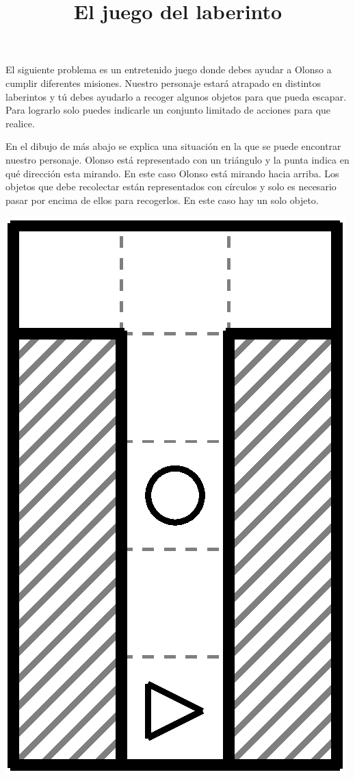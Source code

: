 \documentclass{oci}
\title{El juego del laberinto}
\begin{document}
\begin{problemDescription}
  El siguiente problema es un entretenido juego donde debes ayudar a Olonso a cumplir diferentes misiones.
  Nuestro personaje estará atrapado en distintos laberintos y tú debes ayudarlo a recoger algunos objetos para que pueda escapar.
  Para lograrlo solo puedes indicarle un conjunto limitado de acciones para que realice.
  
En el dibujo de más abajo se explica una situación en la que se puede encontrar nuestro personaje.
  Olonso está representado con un triángulo y la punta indica en qué dirección esta mirando.
En este caso Olonso está mirando hacia arriba.
Los objetos que debe recolectar están representados con círculos y solo es necesario pasar por encima de ellos para recogerlos.
En este caso hay un solo objeto.

\begin{center}
\includegraphics[angle=90,scale=0.5]{laberintos/ejemplo1-1.eps}
\end{center}


\end{problemDescription}
\end{document}
